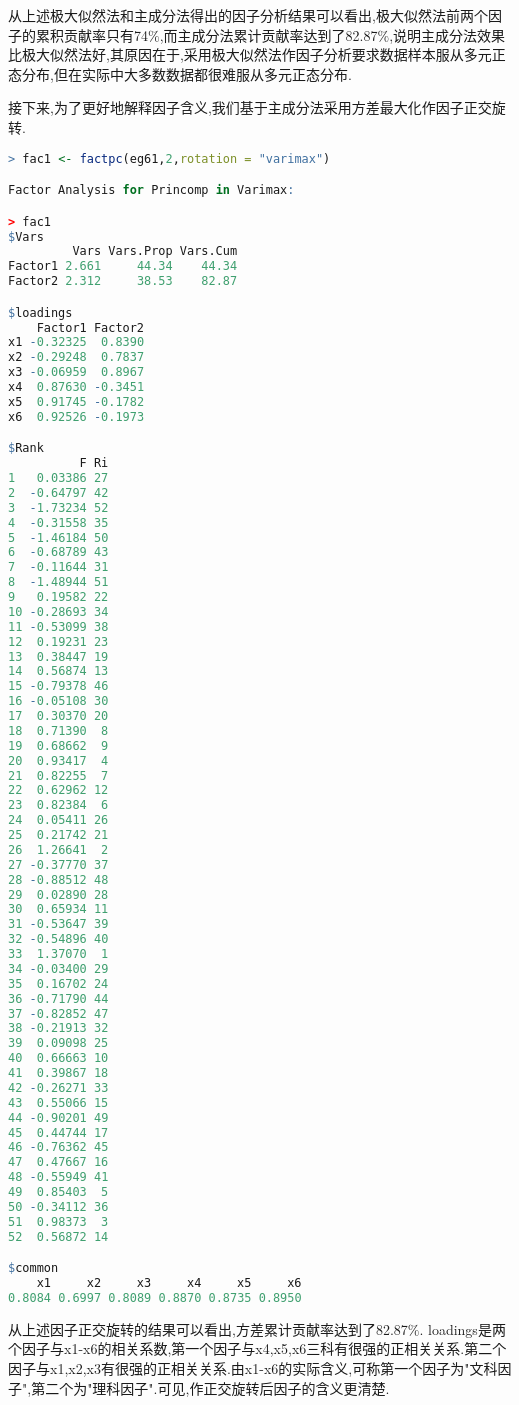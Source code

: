 \documentclass[11pt,a4paper,oneside]{book}
\begin{document}
从上述极大似然法和主成分法得出的因子分析结果可以看出,极大似然法前两个因子的累积贡献率只有74$ \% $,而主成分法累计贡献率达到了82.87$ \% $,说明主成分法效果比极大似然法好,其原因在于,采用极大似然法作因子分析要求数据样本服从多元正态分布,但在实际中大多数数据都很难服从多元正态分布.

接下来,为了更好地解释因子含义,我们基于主成分法采用方差最大化作因子正交旋转.
\begin{lstlisting}[language=r]
> fac1 <- factpc(eg61,2,rotation = "varimax")

Factor Analysis for Princomp in Varimax: 

> fac1
$Vars
         Vars Vars.Prop Vars.Cum
Factor1 2.661     44.34    44.34
Factor2 2.312     38.53    82.87

$loadings
    Factor1 Factor2
x1 -0.32325  0.8390
x2 -0.29248  0.7837
x3 -0.06959  0.8967
x4  0.87630 -0.3451
x5  0.91745 -0.1782
x6  0.92526 -0.1973

$Rank
          F Ri
1   0.03386 27
2  -0.64797 42
3  -1.73234 52
4  -0.31558 35
5  -1.46184 50
6  -0.68789 43
7  -0.11644 31
8  -1.48944 51
9   0.19582 22
10 -0.28693 34
11 -0.53099 38
12  0.19231 23
13  0.38447 19
14  0.56874 13
15 -0.79378 46
16 -0.05108 30
17  0.30370 20
18  0.71390  8
19  0.68662  9
20  0.93417  4
21  0.82255  7
22  0.62962 12
23  0.82384  6
24  0.05411 26
25  0.21742 21
26  1.26641  2
27 -0.37770 37
28 -0.88512 48
29  0.02890 28
30  0.65934 11
31 -0.53647 39
32 -0.54896 40
33  1.37070  1
34 -0.03400 29
35  0.16702 24
36 -0.71790 44
37 -0.82852 47
38 -0.21913 32
39  0.09098 25
40  0.66663 10
41  0.39867 18
42 -0.26271 33
43  0.55066 15
44 -0.90201 49
45  0.44744 17
46 -0.76362 45
47  0.47667 16
48 -0.55949 41
49  0.85403  5
50 -0.34112 36
51  0.98373  3
52  0.56872 14

$common
    x1     x2     x3     x4     x5     x6 
0.8084 0.6997 0.8089 0.8870 0.8735 0.8950 
\end{lstlisting}

从上述因子正交旋转的结果可以看出,方差累计贡献率达到了82.87$ \% $. loadings是两个因子与x1-x6的相关系数,第一个因子与x4,x5,x6三科有很强的正相关关系.第二个因子与x1,x2,x3有很强的正相关关系.由x1-x6的实际含义,可称第一个因子为"文科因子",第二个为"理科因子".可见,作正交旋转后因子的含义更清楚.
\end{document}
